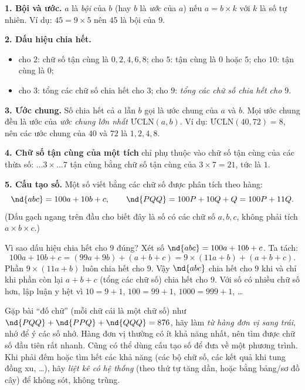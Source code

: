 \begin{knowbox}
\textbf{1. Bội và ước.} $a$ là \emph{bội} của $b$ (hay $b$ là \emph{ước} của $a$) nếu $a = b\times k$ với $k$ là số
tự nhiên. Ví dụ: $45 = 9\times 5$ nên $45$ là bội của $9$.

\textbf{2. Dấu hiệu chia hết.}
\begin{itemize}[leftmargin=1.4em,itemsep=1pt,topsep=2pt]
  \item cho $2$: chữ số tận cùng là $0, 2, 4, 6, 8$; \quad cho $5$: tận cùng là $0$ hoặc $5$; \quad cho $10$: tận cùng là $0$;
  \item cho $3$: tổng các chữ số chia hết cho $3$; \quad cho $9$: \emph{tổng các chữ số chia hết cho $9$}.
\end{itemize}
\textbf{3. Ước chung.} Số chia hết cả $a$ lẫn $b$ gọi là ước chung của $a$ và $b$. Mọi ước chung đều là ước của
\emph{ước chung lớn nhất} ƯCLN$(a,b)$. Ví dụ: ƯCLN$(40,72)=8$, nên các ước chung của $40$ và $72$ là
$1, 2, 4, 8$.

\textbf{4. Chữ số tận cùng của một tích} chỉ phụ thuộc vào chữ số tận cùng của các thừa số:
$\ldots 3 \times \ldots 7$ tận cùng bằng chữ số tận cùng của $3\times 7 = 21$, tức là $1$.

\textbf{5. Cấu tạo số.} Một số viết bằng các chữ số được phân tích theo hàng:
\[ \nd{abc} = 100a + 10b + c, \qquad \nd{PQQ} = 100P + 10Q + Q = 100P + 11Q. \]
(Dấu gạch ngang trên đầu cho biết đây là số có các chữ số $a, b, c$, không phải tích $a\times b\times c$.)
\end{knowbox}
\begin{proofbox}
Vì sao dấu hiệu chia hết cho $9$ đúng? Xét số $\nd{abc} = 100a + 10b + c$. Ta tách:
\[ 100a + 10b + c = (99a + 9b) + (a + b + c) = 9\times(11a + b) + (a+b+c). \]
Phần $9\times(11a+b)$ luôn chia hết cho $9$. Vậy $\nd{abc}$ chia hết cho $9$ khi và chỉ khi phần còn lại
$a+b+c$ (tổng các chữ số) chia hết cho $9$. Với số có nhiều chữ số hơn, lập luận y hệt vì
$10 = 9+1$, $100 = 99+1$, $1000 = 999+1$, \ldots
\end{proofbox}
\begin{tipbox}
Gặp bài ``đố chữ'' (mỗi chữ cái là một chữ số) như $\nd{PQQ}+\nd{PPQ}+\nd{QQQ}=876$, hãy làm \emph{từ hàng đơn vị
sang trái}, nhớ để ý các số nhớ. Hàng đơn vị thường có ít khả năng nhất, nên tìm được chữ số đầu tiên rất nhanh.
Cũng có thể dùng cấu tạo số để đưa về một phương trình. Khi phải đếm hoặc tìm hết các khả năng (các bộ chữ số,
các kết quả khi tung đồng xu, \ldots), hãy \emph{liệt kê có hệ thống} (theo thứ tự tăng dần, hoặc bằng bảng/sơ đồ
cây) để không sót, không trùng.
\end{tipbox}
